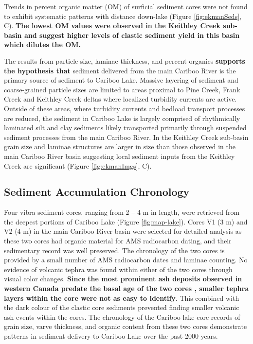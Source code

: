 \documentclass[Royal,times,doublespace,sageh]{sagej}
\begin{document}
Trends in percent organic matter (OM) of surficial sediment cores were
not found to exhibit systematic patterns with distance down-lake (Figure
\ref{fig:ekmanSeds}, C). \textbf{The lowest OM values were observed in
the Keithley Creek sub-basin and suggest higher levels of clastic
sediment yield in this basin which dilutes the OM.}

The results from particle size, laminae thickness, and percent organics
\textbf{supports the hypothesis that} sediment delivered from the main
Cariboo River is the primary source of sediment to Cariboo Lake. Massive
layering of sediment and coarse-grained particle sizes are limited to
areas proximal to Pine Creek, Frank Creek and Keithley Creek deltas
where localized turbidity currents are active. Outside of these areas,
where turbidity currents and bedload transport processes are reduced,
the sediment in Cariboo Lake is largely comprised of rhythmically
laminated silt and clay sediments likely transported primarily through
suspended sediment processes from the main Cariboo River. In the
Keithley Creek sub-basin grain size and laminae structures are larger in
size than those observed in the main Cariboo River basin suggesting
local sediment inputs from the Keithley Creek are significant (Figure
\ref{fig:ekmanImgs}, C).

\hypertarget{sediment-accumulation-chronology}{%
\subsection{Sediment Accumulation
Chronology}\label{sediment-accumulation-chronology}}

Four vibra sediment cores, ranging from 2 -- 4 m in length, were
retrieved from the deepest portions of Cariboo Lake (Figure
\ref{fig:map-lake}). Cores V1 (3 m) and V2 (4 m) in the main Cariboo
River basin were selected for detailed analysis as these two cores had
organic material for AMS radiocarbon dating, and their sedimentary
record was well preserved. The chronology of the two cores is provided
by a small number of AMS radiocarbon dates and laminae counting. No
evidence of volcanic tephra was found within either of the two cores
through visual color changes. \textbf{Since the most prominent ash
deposits observed in western Canada predate the basal age of the two
cores \citep{Westgate1977, Hallett1997}, smaller tephra layers within
the core were not as easy to identify}. This combined with the dark
colour of the clastic core sediments prevented finding smaller volcanic
ash events within the cores. The chronology of the Cariboo lake core
records of grain size, varve thickness, and organic content from these
two cores demonstrate patterns in sediment delivery to Cariboo Lake over
the past 2000 years.
\end{document}
